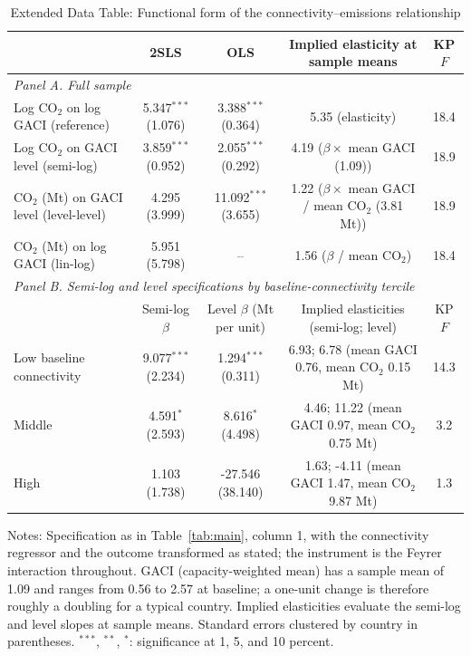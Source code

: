 \begin{table}[htbp]
\centering
\begin{threeparttable}
\caption{Extended Data Table: Functional form of the connectivity--emissions relationship}
\label{tab:funcform}
\footnotesize
\begin{tabular}{lcccc}
\toprule
 & 2SLS & OLS & Implied elasticity at sample means & KP $F$ \\
\midrule
\multicolumn{5}{l}{\textit{Panel A. Full sample}} \\
  Log CO$_2$ on log GACI (reference) & 5.347$^{***}$ (1.076) & 3.388$^{***}$ (0.364) & 5.35 (elasticity) & 18.4 \\
  Log CO$_2$ on GACI level (semi-log) & 3.859$^{***}$ (0.952) & 2.055$^{***}$ (0.292) & 4.19 ($\beta \times$ mean GACI (1.09)) & 18.9 \\
  CO$_2$ (Mt) on GACI level (level-level) & 4.295 (3.999) & 11.092$^{***}$ (3.655) & 1.22 ($\beta \times$ mean GACI / mean CO$_2$ (3.81 Mt)) & 18.9 \\
  CO$_2$ (Mt) on log GACI (lin-log) & 5.951 (5.798) & -- & 1.56 ($\beta$ / mean CO$_2$) & 18.4 \\
\midrule
\multicolumn{5}{l}{\textit{Panel B. Semi-log and level specifications by baseline-connectivity tercile}} \\
 & Semi-log $\beta$ & Level $\beta$ (Mt per unit) & Implied elasticities (semi-log; level) & KP $F$ \\
  Low baseline connectivity & 9.077$^{***}$ (2.234) & 1.294$^{***}$ (0.311) & 6.93; 6.78 (mean GACI 0.76, mean CO$_2$ 0.15 Mt) & 14.3 \\
  Middle & 4.591$^{*}$ (2.593) & 8.616$^{*}$ (4.498) & 4.46; 11.22 (mean GACI 0.97, mean CO$_2$ 0.75 Mt) & 3.2 \\
  High & 1.103 (1.738) & -27.546 (38.140) & 1.63; -4.11 (mean GACI 1.47, mean CO$_2$ 9.87 Mt) & 1.3 \\
\bottomrule
\end{tabular}
\begin{tablenotes}[flushleft]
\footnotesize
\item Notes: Specification as in Table~\ref{tab:main}, column 1, with the connectivity regressor and the outcome transformed as stated; the instrument is the Feyrer interaction throughout. GACI (capacity-weighted mean) has a sample mean of 1.09 and ranges from 0.56 to 2.57 at baseline; a one-unit change is therefore roughly a doubling for a typical country. Implied elasticities evaluate the semi-log and level slopes at sample means. Standard errors clustered by country in parentheses. $^{***}$, $^{**}$, $^{*}$: significance at 1, 5, and 10 percent.
\end{tablenotes}
\end{threeparttable}
\end{table}

